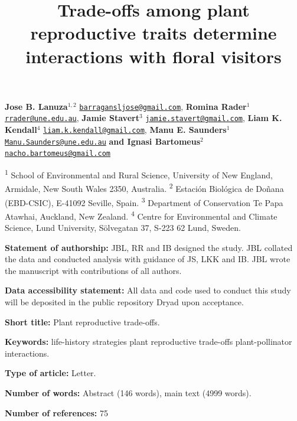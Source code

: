 \documentclass[
  12pt,
  a4paper,
]{article}
\title{\singlespacing \vspace{-1.6cm} \LARGE Trade-offs among plant reproductive traits determine interactions with floral visitors}
\author{}
\date{\vspace{-2.5em}}
\begin{document}
\maketitle

\vspace{-1.4cm}

\singlespacing

\textbf{Jose B. Lanuza$^{1,2}$} \href{mailto:barragansljose@gmail.com}{\nolinkurl{barragansljose@gmail.com}}, \textbf{Romina Rader$^{1}$} \href{mailto:rrader@une.edu.au}{\nolinkurl{rrader@une.edu.au}}, \textbf{Jamie Stavert$^{3}$} \href{mailto:jamie.stavert@gmail.com}{\nolinkurl{jamie.stavert@gmail.com}}, \textbf{Liam K. Kendall$^{4}$} \href{mailto:liam.k.kendall@gmail.com}{\nolinkurl{liam.k.kendall@gmail.com}}, \textbf{Manu E. Saunders$^{1}$} \href{mailto:Manu.Saunders@une.edu.au}{\nolinkurl{Manu.Saunders@une.edu.au}} \textbf{and Ignasi Bartomeus$^{2}$} \href{mailto:nacho.bartomeus@gmail.com}{\nolinkurl{nacho.bartomeus@gmail.com}}

\small

\textsuperscript{1} School of Environmental and Rural Science, University of New England, Armidale, New South Wales 2350, Australia. \textsuperscript{2} Estación Biológica de Doñana (EBD-CSIC), E-41092 Seville, Spain. \textsuperscript{3} Department of Conservation \textbar{} Te Papa Atawhai, Auckland, New Zealand. \textsuperscript{4} Centre for Environmental and Climate Science, Lund University, Sölvegatan 37, S-223 62 Lund, Sweden.

\doublespacing
\normalsize

\textbf{Statement of authorship:} JBL, RR and IB designed the study. JBL collated the data and conducted analysis with guidance of JS, LKK and IB. JBL wrote the manuscript with contributions of all authors.

\textbf{Data accessibility statement:} All data and code used to conduct this study will be deposited in the public repository Dryad upon acceptance.

\textbf{Short title:} Plant reproductive trade-offs.

\textbf{Keywords:} life-history strategies \textbar{} plant reproductive trade-offs \textbar{} plant-pollinator interactions.

\textbf{Type of article:} Letter.

\textbf{Number of words:} Abstract (146 words), main text (4999 words).

\textbf{Number of references:} 75
\end{document}
